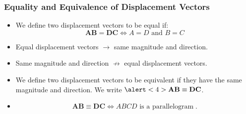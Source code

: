 \begin{frame}
\frametitle{Equality and Equivalence of Displacement Vectors}
\begin{itemize}
\item<1-> We define two displacement vectors to be equal if:
\[ 
\textbf{AB} = \textbf{DC}  \Longleftrightarrow A=D \text{ and } B=C
\]
\item<2-> Equal displacement vectors $\rightarrow$ same magnitude and direction.
\item<3-> Same magnitude and direction $\not\rightarrow$ equal displacement vectors. 

\item<4-> We define two displacement vectors to be \alert<4>{equivalent} if they have the \alert<4>{same magnitude and direction}. We write $\alert<4>{\textbf{AB} \equiv \textbf{DC}}$.
\item 
\[ 
\textbf{AB} \equiv \textbf{DC} \Longleftrightarrow ABCD \text{ is a parallelogram}\;.
\]
\end{itemize}
\end{frame}